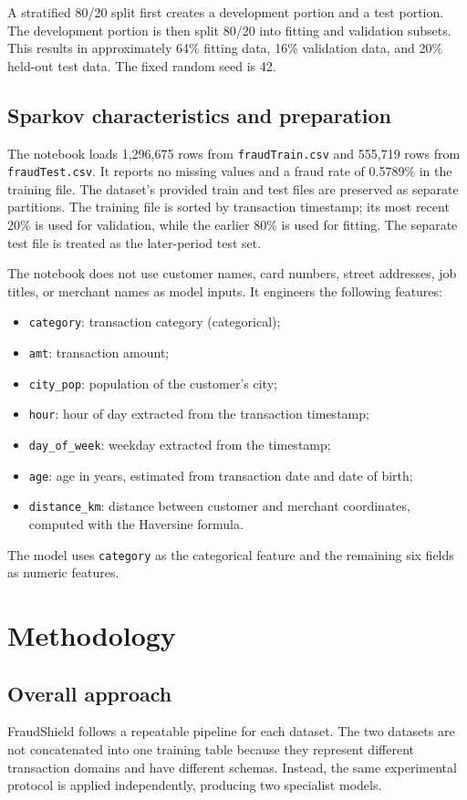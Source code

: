 \documentclass[12pt,a4paper]{report}
\begin{document}
A stratified 80/20 split first creates a development portion and a test portion. The development portion is then split 80/20 into fitting and validation subsets. This results in approximately 64\% fitting data, 16\% validation data, and 20\% held-out test data. The fixed random seed is 42.

\section{Sparkov characteristics and preparation}
The notebook loads 1,296,675 rows from \texttt{fraudTrain.csv} and 555,719 rows from \texttt{fraudTest.csv}. It reports no missing values and a fraud rate of 0.5789\% in the training file. The dataset's provided train and test files are preserved as separate partitions. The training file is sorted by transaction timestamp; its most recent 20\% is used for validation, while the earlier 80\% is used for fitting. The separate test file is treated as the later-period test set.

The notebook does not use customer names, card numbers, street addresses, job titles, or merchant names as model inputs. It engineers the following features:
\begin{itemize}
  \item \texttt{category}: transaction category (categorical);
  \item \texttt{amt}: transaction amount;
  \item \texttt{city\_pop}: population of the customer's city;
  \item \texttt{hour}: hour of day extracted from the transaction timestamp;
  \item \texttt{day\_of\_week}: weekday extracted from the timestamp;
  \item \texttt{age}: age in years, estimated from transaction date and date of birth;
  \item \texttt{distance\_km}: distance between customer and merchant coordinates, computed with the Haversine formula.
\end{itemize}
The model uses \texttt{category} as the categorical feature and the remaining six fields as numeric features.

\chapter{Methodology}
\section{Overall approach}
FraudShield follows a repeatable pipeline for each dataset. The two datasets are not concatenated into one training table because they represent different transaction domains and have different schemas. Instead, the same experimental protocol is applied independently, producing two specialist models.
\end{document}
